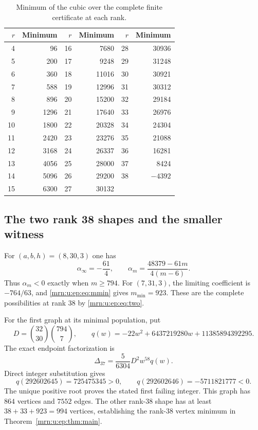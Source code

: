 \documentclass[11pt,a4paper]{article}
\theoremstyle{remark}\newtheorem{remark}[theorem]{Remark}
\begin{document}
\begin{table}[htbp]\centering\small
\caption{Minimum of the cubic over the complete finite certificate at each rank.}\label{mrn:u:ep:tab:minima}
\begin{tabular}{rr@{\qquad}rr@{\qquad}rr}
\toprule
$r$ & Minimum & $r$ & Minimum & $r$ & Minimum\\\midrule
4&96&16&7680&28&30936\\
5&200&17&9248&29&31248\\
6&360&18&11016&30&30921\\
7&588&19&12996&31&30312\\
8&896&20&15200&32&29184\\
9&1296&21&17640&33&26976\\
10&1800&22&20328&34&24304\\
11&2420&23&23276&35&21088\\
12&3168&24&26337&36&16281\\
13&4056&25&28000&37&8424\\
14&5096&26&29200&38&$-4392$\\
15&6300&27&30132&&\\\bottomrule
\end{tabular}
\end{table}

\subsection{The two rank 38 shapes and the smaller witness}
For $(a,b,h)=(8,30,3)$ one has
\[
 \alpha_\infty=-\frac{61}{4},\qquad
 \alpha_m=\frac{48379-61m}{4(m-6)}.
\]
Thus $\alpha_m<0$ exactly when $m\ge794$. For $(7,31,3)$, the limiting coefficient is $-764/63$, and \eqref{mrn:u:ep:eq:mmin} gives $m_{\min}=923$. These are the complete possibilities at rank $38$ by \eqref{mrn:u:ep:eq:two}.

For the first graph at its minimal population, put
\[
 D=\binom{32}{30}\binom{794}{7},\qquad
 q(w)=-22w^2+6437219280w+11385894392295.
\]
The exact endpoint factorization is
\begin{equation}\label{mrn:u:ep:eq:witness}
 \Delta_{37}=\frac{5}{6304}D^2w^{58}q(w).
\end{equation}
Direct integer substitution gives
\[
 q(292602645)=725475345>0,\qquad
 q(292602646)=-5711821777<0.
\]
The unique positive root proves the stated first failing integer. This graph has $864$ vertices and $7552$ edges. The other rank-$38$ shape has at least $38+33+923=994$ vertices, establishing the rank-$38$ vertex minimum in Theorem~\ref{mrn:u:ep:thm:main}.
\end{document}
